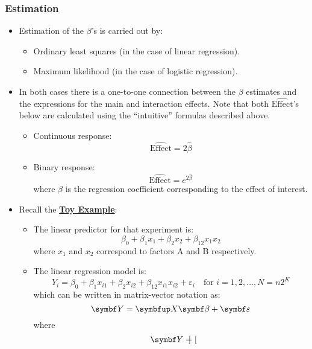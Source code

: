 \subsubsection*{Estimation}
\begin{itemize}
      \item Estimation of the $ \beta $'s is carried out by:
            \begin{itemize}[$\hookrightarrow$]
                  \item Ordinary least squares (in the case of linear regression).
                  \item Maximum likelihood (in the case of logistic regression).
            \end{itemize}
      \item In both cases there is a one-to-one connection between the $ \beta $ estimates and the expressions for the
            main and interaction effects. Note that both $ \widehat{\text{Effect}} $'s below
            are calculated using the ``intuitive'' formulas described above.
            \begin{itemize}
                  \item Continuous response:
                        \[ \widehat{\text{Effect}}=2\hat{\beta} \]
                  \item Binary response:
                        \[ \widehat{\text{Effect}}=e^{2\hat{\beta}} \]
                        where $ \beta $ is the regression coefficient corresponding to the effect of interest.
            \end{itemize}
      \item Recall the \hyperref[ex:toy_ex]{\textbf{Toy Example}}:
            \begin{itemize}
                  \item The linear predictor for that experiment is:
                        \[ \beta_0+\beta_1x_1+\beta_2x_2+\beta_{12}x_1x_2 \]
                        where $ x_1 $ and $ x_2 $ correspond to factors A and B respectively.
                  \item The linear regression model is:
                        \[ Y_i=\beta_0+\beta_1x_{i1}+\beta_2x_{i2}+\beta_{12}x_{i1}x_{i2}+\varepsilon_i\quad \text{for }i=1,2,\ldots,N=n2^K \]
                        which can be written in matrix-vector notation as:
                        \[ \RandomVector{Y}=\Matrix{X}\Vector{\beta}+\RandomVector{\varepsilon} \]
                        where
                        \[ \RandomVector{Y}=\begin{bmatrix}

\end{bmatrix}\]
\end{itemize}
\end{itemize}
